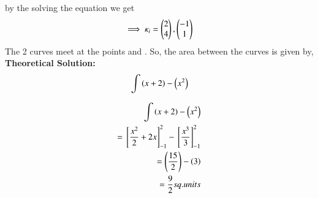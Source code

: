 \documentclass[journal]{IEEEtran}
\begin{document}
by the solving the equation we get
\begin{align}	
	\implies \kappa_i = \begin{pmatrix} 2\\4\end{pmatrix} , \begin{pmatrix}-1\\ 1\end{pmatrix}
\end{align}
The 2 curves meet at the points  and . So, the area between the curves is given by,\\
\textbf{Theoretical Solution:}\\
\begin{align}
	\int{\ensuremath{\left(x + 2\right)} - {\ensuremath{\left(x^2\right)}}}
\end{align}



\begin{align}
	\int{\ensuremath{\left(x + 2\right)} - {\ensuremath{\left(x^2\right)}}} \\
	= {}\left[{\frac{x^2}{2}} + 2x\right]_{-1}^{2} - {}\left[{\frac{x^3}{3}}\right]_{-1}^{2}\\
	= \left(\frac{15}{2}\right) - \left(3\right)\\
	= \frac{9}{2} sq.units
\end{align}
\end{document}
